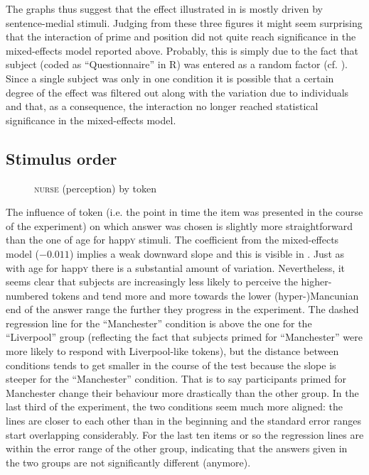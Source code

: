 The graphs thus suggest that the  effect illustrated in  is mostly driven by sentence-medial stimuli.
Judging from these three figures it might seem surprising that the interaction of prime and position did not quite reach significance in the mixed-effects model reported above.
Probably, this is simply due to the fact that subject (coded as ``Questionnaire'' in R) was entered as a random factor (cf. ).
Since a single subject was only in one  condition it is possible that a certain degree of the  effect was filtered out along with the variation due to individuals and that, as a consequence, the interaction no longer reached statistical significance in the mixed-effects model.

\subsection{Stimulus order}
\label{sec.perc_res.nurse.order}

\begin{figure}[b]
	
		\resizebox{.49\linewidth}{!}{} 
	\caption{\textsc{nurse} (perception) by token}
	\label{fig.scatter.nurse.ext.token}
\end{figure}

The influence of token (i.e. the point in time the item was presented in the course of the experiment) on which answer was chosen is slightly more straightforward than the one of age for happ\textsc{y} stimuli.
The coefficient from the mixed-effects model (\ensuremath{-0.011}) implies a weak downward slope and this is visible in .
Just as with age for happ\textsc{y} there is a substantial amount of variation.
Nevertheless, it seems clear that subjects are increasingly less likely to perceive the higher-numbered tokens and tend more and more towards the lower (hyper-)Mancunian end of the answer range the further they progress in the experiment.
The dashed regression line for the ``Manchester''  condition is above the one for the ``Liverpool'' group (reflecting the fact that subjects primed for ``Manchester'' were more likely to respond with Liverpool-like tokens), but the distance between conditions tends to get smaller in the course of the test because the slope is steeper for the ``Manchester'' condition. That is to say participants primed for Manchester change their behaviour more drastically than the other group.
In the last third of the experiment, the two conditions seem much more aligned: the lines are closer to each other than in the beginning and the standard error ranges start overlapping considerably.
For the last ten items or so the regression lines are within the error range of the other group, indicating that the answers given in the two groups are not significantly different (anymore).

